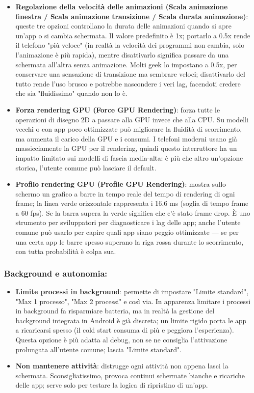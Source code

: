 \begin{itemize}
  \item \textbf{Regolazione della velocità delle animazioni (Scala animazione finestra / Scala animazione transizione / Scala durata animazione)}: queste tre opzioni controllano la durata delle animazioni quando si apre un'app o si cambia schermata. Il valore predefinito è 1x; portarlo a 0.5x rende il telefono "più veloce" (in realtà la velocità dei programmi non cambia, solo l'animazione è più rapida), mentre disattivarlo significa passare da una schermata all'altra senza animazione. Molti geek lo impostano a 0.5x, per conservare una sensazione di transizione ma sembrare veloci; disattivarlo del tutto rende l'uso brusco e potrebbe nascondere i veri lag, facendoti credere che sia "fluidissimo" quando non lo è.
  \item \textbf{Forza rendering GPU (Force GPU Rendering)}: forza tutte le operazioni di disegno 2D a passare alla GPU invece che alla CPU. Su modelli vecchi o con app poco ottimizzate può migliorare la fluidità di scorrimento, ma aumenta il carico della GPU e i consumi. I telefoni moderni usano già massicciamente la GPU per il rendering, quindi questo interruttore ha un impatto limitato sui modelli di fascia media-alta: è più che altro un'opzione storica, l'utente comune può lasciare il default.
  \item \textbf{Profilo rendering GPU (Profile GPU Rendering)}: mostra sullo schermo un grafico a barre in tempo reale del tempo di rendering di ogni frame; la linea verde orizzontale rappresenta i 16,6 ms (soglia di tempo frame a 60 fps). Se la barra supera la verde significa che c'è stato frame drop. È uno strumento per sviluppatori per diagnosticare i lag delle app; anche l'utente comune può usarlo per capire quali app siano peggio ottimizzate — se per una certa app le barre spesso superano la riga rossa durante lo scorrimento, con tutta probabilità è colpa sua.
\end{itemize}

\subsubsection*{Background e autonomia:}

\begin{itemize}
  \item \textbf{Limite processi in background}: permette di impostare "Limite standard", "Max 1 processo", "Max 2 processi" e così via. In apparenza limitare i processi in background fa risparmiare batteria, ma in realtà la gestione del background integrata in Android è già discreta; un limite rigido porta le app a ricaricarsi spesso (il cold start consuma di più e peggiora l'esperienza). Questa opzione è più adatta al debug, non se ne consiglia l'attivazione prolungata all'utente comune; lascia "Limite standard".
  \item \textbf{Non mantenere attività}: distrugge ogni attività non appena lasci la schermata. Sconsigliatissimo, provoca continui schermate bianche e ricariche delle app; serve solo per testare la logica di ripristino di un'app.
\end{itemize}

